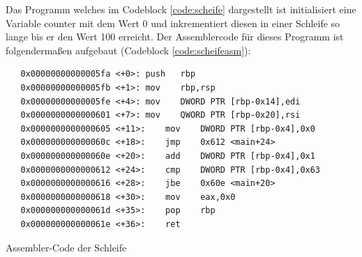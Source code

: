 \documentclass[12pt]{article}
\begin{document}
\noindent Das Programm welches im Codeblock \ref{code:scheife} dargestellt ist initialisiert eine Variable counter mit dem Wert 0 und inkrementiert diesen in einer Schleife so lange bis er den Wert 100 erreicht. Der Assemblercode für dieses Programm ist folgendermaßen aufgebaut (Codeblock \ref{code:scheifeasm}):


\begin{code}[!htb]
\begin{lstlisting}
   0x00000000000005fa <+0>:	push   rbp
   0x00000000000005fb <+1>:	mov    rbp,rsp
   0x00000000000005fe <+4>:	mov    DWORD PTR [rbp-0x14],edi
   0x0000000000000601 <+7>:	mov    QWORD PTR [rbp-0x20],rsi
   0x0000000000000605 <+11>:	mov    DWORD PTR [rbp-0x4],0x0
   0x000000000000060c <+18>:	jmp    0x612 <main+24>
   0x000000000000060e <+20>:	add    DWORD PTR [rbp-0x4],0x1
   0x0000000000000612 <+24>:	cmp    DWORD PTR [rbp-0x4],0x63
   0x0000000000000616 <+28>:	jbe    0x60e <main+20>
   0x0000000000000618 <+30>:	mov    eax,0x0
   0x000000000000061d <+35>:	pop    rbp
   0x000000000000061e <+36>:	ret    
\end{lstlisting}
\caption[Assembler Code einfache Schleife]{Assembler-Code der Schleife}
\label{code:scheifeasm}
\end{code}
\end{document}
